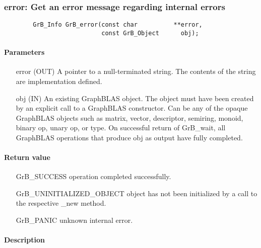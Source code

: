 \subsubsection{{\sf error}: Get an error message regarding internal errors}
\label{Sec:GrB_error}

\begin{verbatim}
        GrB_Info GrB_error(const char          **error,
                           const GrB_Object      obj);
\end{verbatim}

\paragraph{Parameters}

\begin{itemize}[leftmargin=1.1in]
	\item[{\sf error}] ({\sf OUT}) A pointer to a null-terminated
		string. The contents of the string are implementation
		defined.

        \item[{\sf obj}] ({\sf IN}) An existing GraphBLAS object.
        The object must have been created by an explicit call to a
        GraphBLAS constructor.  Can be any of the opaque GraphBLAS
        objects such as matrix, vector, descriptor, semiring, monoid,
        binary op, unary op, or type. On successful return of {\sf
        GrB\_wait}, all GraphBLAS operations that produce {\sf obj}
        as output have fully completed.
\end{itemize}


\paragraph{Return value}
\begin{itemize}[leftmargin=2.3in]
	\item[{\sf GrB\_SUCCESS}]			operation completed successfully.
	\item[{\sf GrB\_UNINITIALIZED\_OBJECT}]		object has not been initialized by a call to the respective {\sf *\_new} method.
	\item[{\sf GrB\_PANIC}]				unknown internal error.
\end{itemize}

\paragraph{Description}

